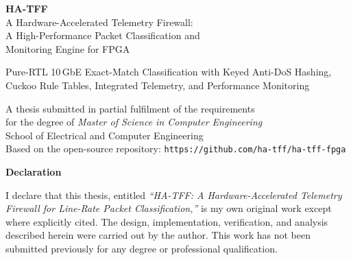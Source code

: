 \documentclass[12pt,twoside,openright]{book}
\begin{document}
\frontmatter

\begin{titlepage}

\vspace*{15mm}
\begin{center}
{\color{white}\fontsize{24}{30}\selectfont\bfseries HA-TFF}\\[4mm]
{\color{white!80!smartblue}\fontsize{13}{17}\selectfont A Hardware-Accelerated Telemetry Firewall:\\
A High-Performance Packet Classification and\\Monitoring Engine for FPGA}\\[16mm]

\begin{tcolorbox}[colback=white,colframe=smartblue,arc=4pt,width=0.92\textwidth,boxrule=1pt]
{\large\color{smartgray} Pure-RTL 10\,GbE Exact-Match Classification with Keyed Anti-DoS Hashing,\\
Cuckoo Rule Tables, Integrated Telemetry, and Performance Monitoring}
\end{tcolorbox}

\vspace{16mm}
{\small\color{smartgray}
A thesis submitted in partial fulfilment of the requirements\\
for the degree of \textit{Master of Science in Computer Engineering}\\[4mm]
School of Electrical and Computer Engineering\\[4mm]
Based on the open-source repository: \texttt{https://github.com/ha-tff/ha-tff-fpga}}
\end{center}
\end{titlepage}

\cleardoublepage
\thispagestyle{empty}
\vspace*{40mm}
\begin{center}
{\Large\bfseries Declaration}
\end{center}
\vspace{8mm}
\noindent I declare that this thesis, entitled \emph{``HA-TFF: A Hardware-Accelerated Telemetry
Firewall for Line-Rate Packet Classification,''} is my own original work except where explicitly
cited. The design, implementation, verification, and analysis described herein were carried out by
the author. This work has not been submitted previously for any degree or professional qualification.
\end{document}
